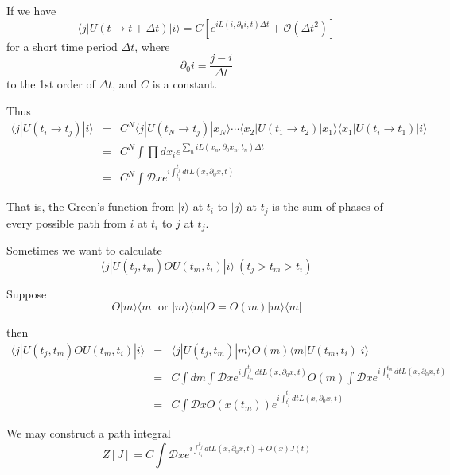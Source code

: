 \documentclass[12pt]{book}
\begin{document}
	If we have
	\begin{equation}
		\langle j|U(t\rightarrow t+\Delta t)|i\rangle=C[e^{iL( i,\partial_0 i,t)\Delta t}+\mathcal O(\Delta t^2)]
	\end{equation}
	for a short time period $\Delta t$, where
	\begin{equation}
		\partial_0 i=\frac{ j- i}{\Delta t}
	\end{equation}
	to the 1st order of $\Delta t$, and $C$ is a constant.
	
	Thus
	\begin{eqnarray}
		\langle j|U(t_i\rightarrow t_j)|i\rangle &=&C^N\langle j|U(t_N\rightarrow t_j)|x_N\rangle\cdots \langle x_2|U(t_1 \rightarrow t_2)|x_1\rangle \langle x_1|U(t_i \rightarrow t_1)|i\rangle\\
		&=&C^N\int\prod dx_ie^{\sum_n iL( x_n,\partial_0  x_n,t_n)\Delta t}\\
		&=&C^N\int \mathcal D  xe^{i\int_{t_i}^{t_j}dtL(x,\partial_0 x,t)}
	\end{eqnarray}
	
	That is, the Green's function from $|i\rangle$ at $t_i$ to $|j\rangle$ at $t_j$ is the sum of phases of every possible path from $ i$ at $t_i$ to $ j$ at $t_j$.
	
	Sometimes we want to calculate
	\begin{equation}
		\langle j|U(t_j,t_m)OU(t_m,t_i)|i\rangle\ (t_j>t_m>t_i)
	\end{equation}
	
	Suppose
	\begin{equation}
		O|m\rangle\langle m|\text{ or }|m\rangle\langle m|O =O(m)|m\rangle\langle m|
	\end{equation}
	
	then
	\begin{eqnarray}
		\langle j|U(t_j,t_m)OU(t_m,t_i)|i\rangle&=&\langle j|U(t_j,t_m)|m\rangle O(m)\langle m|U(t_m,t_i)|i\rangle\\
		&=&C\int dm\int \mathcal D  xe^{i\int_{t_m}^{t_j}dtL(x,\partial_0 x,t)} O(m)\int \mathcal D  xe^{i\int_{t_i}^{t_m}dtL(x,\partial_0 x,t)}\\
		&=&C\int \mathcal D x O(x(t_m))e^{i\int_{t_i}^{t_j}dtL(x,\partial_0 x,t)}
	\end{eqnarray}
	
	We may construct a path integral
	\begin{equation}
		Z[J]=C\int \mathcal D  xe^{i\int_{t_i}^{t_j}dtL(x,\partial_0 x,t)+O(x)J(t)}
	\end{equation}
	
\end{document}
